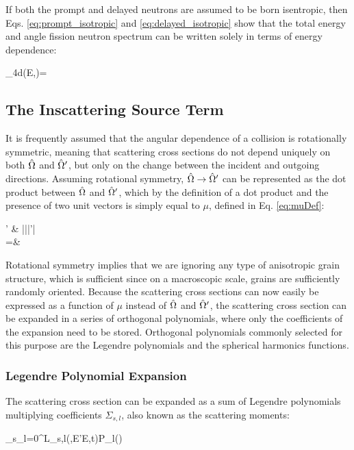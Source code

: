 If both the prompt and delayed neutrons are assumed to be born isentropic, then Eqs. \eqref{eq:prompt_isotropic} and \eqref{eq:delayed_isotropic} show that the total energy and angle fission neutron spectrum can be written solely in terms of energy dependence:

\beq
\int_{4\pi}d\hO\chi(E,\hO)=
\eeq

\subsection{The Inscattering Source Term}

It is frequently assumed that the angular dependence of a collision is rotationally symmetric, meaning that scattering cross sections do not depend uniquely on both \(\hat{\Omega}\) and \(\hat{\Omega}'\), but only on the change between the incident and outgoing directions. Assuming rotational symmetry, \(\hat{\Omega}\rightarrow\hat{\Omega}'\) can be represented as the dot product between \(\hat{\Omega}\) and \(\hat{\Omega}'\), which by the definition of a dot product and the presence of two unit vectors is simply equal to \(\mu\), defined in Eq. \eqref{eq:muDef}:

\beqa
\label{eq:OmegaDotOmega}
\hO  \cdot\hO  ' \equiv& |\hO  ||\hO  '| \cos{(\theta)} \\
=&\ \mu
\eeqa

Rotational symmetry implies that we are ignoring any type of anisotropic grain structure, which is sufficient since on a macroscopic scale, grains are sufficiently randomly oriented. Because the scattering cross sections can now easily be expressed as a function of \(\mu\) instead of \(\hat{\Omega}\) and \(\hat{\Omega}'\), the scattering cross section can be expanded in a series of orthogonal polynomials, where only the coefficients of the expansion need to be stored. Orthogonal polynomials commonly selected for this purpose are the Legendre polynomials and the spherical harmonics functions.

\subsubsection{Legendre Polynomial Expansion}
\label{sec:LegendrePolynomialExpansion}

The scattering cross section can be expanded as a sum of Legendre polynomials multiplying coefficients \(\Sigma_{s,l}\), also known as the scattering moments:

\beq
\label{eq:ScatteringLegendre}
\Sigma_s\seatout \equiv\sum_{l=0}^L\Sigma_{s,l}(,E'\rightarrow E,t)P_l(\mu)
\eeq

